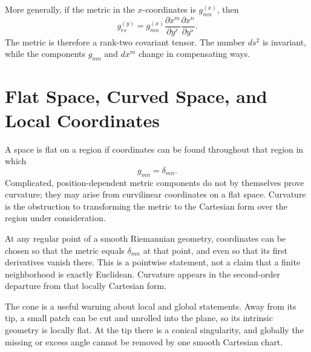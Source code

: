 More generally, if the metric in the \(x\)-coordinates is
\(g_{mn}^{(x)}\), then
\begin{equation}
  \boxed{
  g_{rs}^{(y)}
  =
  g_{mn}^{(x)}
  \frac{\partial x^{m}}{\partial y^{r}}
  \frac{\partial x^{n}}{\partial y^{s}}.}
  \label{eq:l03-general-metric-transform}
\end{equation}
The metric is therefore a rank-two covariant tensor. The number \(ds^{2}\)
is invariant, while the components \(g_{mn}\) and \(dx^{m}\) change in
compensating ways.

\section{Flat Space, Curved Space, and Local Coordinates}

A space is flat on a region if coordinates can be found throughout that
region in which
\begin{equation}
  g_{mn}=\delta_{mn}.
  \label{eq:l03-flatness}
\end{equation}
Complicated, position-dependent metric components do not by themselves
prove curvature; they may arise from curvilinear coordinates on a flat
space. Curvature is the obstruction to transforming the metric to the
Cartesian form over the region under consideration.

\begin{classroomqa}
\end{classroomqa}

At any regular point of a smooth Riemannian geometry, coordinates can be
chosen so that the metric equals \(\delta_{mn}\) at that point, and even so
that its first derivatives vanish there. This is a pointwise statement, not
a claim that a finite neighborhood is exactly Euclidean. Curvature appears
in the second-order departure from that locally Cartesian form.

The cone is a useful warning about local and global statements. Away from
its tip, a small patch can be cut and unrolled into the plane, so its
intrinsic geometry is locally flat. At the tip there is a conical
singularity, and globally the missing or excess angle cannot be removed by
one smooth Cartesian chart.

